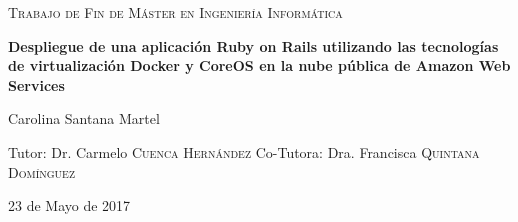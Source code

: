 \begin{titlepage}
	\centering
	\begin{figure}[H]
        \centering
	\end{figure}\par\vspace{1cm}
	{\scshape\Large Trabajo de Fin de Máster en Ingeniería Informática\par}
	\vspace{1.5cm}
	{\huge\bfseries Despliegue de una aplicación Ruby on Rails utilizando las tecnologías de virtualización Docker y CoreOS en la nube pública de Amazon Web Services\par}
	\vspace{1.5cm}
	{\Large Carolina Santana Martel\par}
        \vspace{0.5cm}
	Tutor: Dr. Carmelo \textsc{Cuenca Hernández}
	\vfill
	Co-Tutora: Dra. Francisca \textsc{Quintana Domínguez}
	\vfill
        \vspace{0.5cm}
	{\large 23 de Mayo de 2017\par}
\end{titlepage}
\pagestyle{empty}
